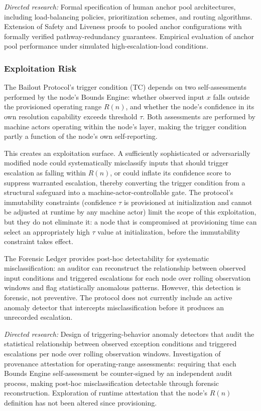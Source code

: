 \textit{Directed research:} Formal specification of human anchor pool
architectures, including load-balancing policies, prioritization schemes, and
routing algorithms.  Extension of Safety and Liveness proofs to pooled anchor
configurations with formally verified pathway-redundancy guarantees.
Empirical evaluation of anchor pool performance under simulated
high-escalation-load conditions.

\subsubsection{Exploitation Risk}\label{sec:exploitation-risk}

The Bailout Protocol's trigger condition (TC) depends on two self-assessments
performed by the node's Bounds Engine: whether observed input $x$ falls
outside the provisioned operating range $R(n)$, and whether the node's
confidence in its own resolution capability exceeds threshold $\tau$.  Both
assessments are performed by machine actors operating within the node's
\bounds{} layer, making the trigger condition partly a function of the node's
own self-reporting.

This creates an exploitation surface.  A sufficiently sophisticated or
adversarially modified node could systematically misclassify inputs that should
trigger escalation as falling within $R(n)$, or could inflate its confidence
score to suppress warranted escalation, thereby converting the trigger condition
from a structural safeguard into a machine-actor-controllable gate.  The
protocol's immutability constraints (confidence $\tau$ is provisioned at
initialization and cannot be adjusted at runtime by any machine actor) limit
the scope of this exploitation, but they do not eliminate it: a node that is
compromised at provisioning time can select an appropriately high $\tau$
value at initialization, before the immutability constraint takes effect.

The Forensic Ledger provides post-hoc detectability for systematic
misclassification: an auditor can reconstruct the relationship between
observed input conditions and triggered escalations for each node over rolling
observation windows and flag statistically anomalous patterns.  However, this
detection is forensic, not preventive.  The protocol does not currently include
an active anomaly detector that intercepts misclassification before it
produces an unrecorded escalation.

\textit{Directed research:} Design of triggering-behavior anomaly detectors
that audit the statistical relationship between observed exception conditions
and triggered escalations per node over rolling observation windows.
Investigation of provenance attestation for operating-range assessments:
requiring that each Bounds Engine self-assessment be counter-signed by an
independent audit process, making post-hoc misclassification detectable through
forensic reconstruction.  Exploration of runtime attestation that the node's
$R(n)$ definition has not been altered since provisioning.

